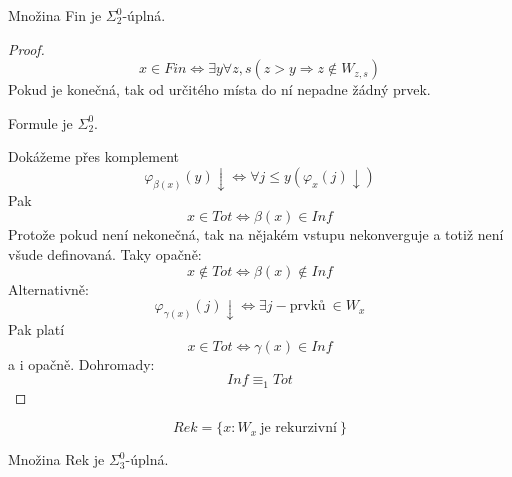 \begin{theorem}
	Množina Fin je $\Sigma_2^0$-úplná.
\end{theorem}
\begin{proof}
	\[ x \in Fin \iff \exists y \forall z, s (z > y \Rightarrow z \notin W_{z, s}) \]
	Pokud je konečná, tak od určitého místa do ní nepadne žádný prvek.

	Formule je $\Sigma_2^0$.

	Dokážeme přes komplement
	\[ \varphi_{\beta(x)}(y) \downarrow \iff \forall j \leq y (\varphi_x(j) \downarrow) \]
	Pak
	\[ x \in Tot \iff \beta(x) \in Inf \]
	Protože pokud není nekonečná, tak na nějakém vstupu nekonverguje a totiž není všude definovaná.
	Taky opačně:
	\[ x \notin Tot \iff \beta(x) \notin Inf \]
	Alternativně:
	\[ \varphi_{\gamma(x)} (j) \downarrow \iff \exists j-\text{prvků}\ \in W_x \]
	Pak platí
	\[ x \in Tot \iff \gamma(x) \in Inf \]
	a i opačně.
	Dohromady:
	\[ Inf \equiv_1 Tot \]
\end{proof}

\begin{definition}[Rek]
	\[ Rek = \{ x: W_x\ \text{je rekurzivní}\ \} \]
\end{definition}

\begin{theorem}
	Množina Rek je $\Sigma_3^0$-úplná.
\end{theorem}
